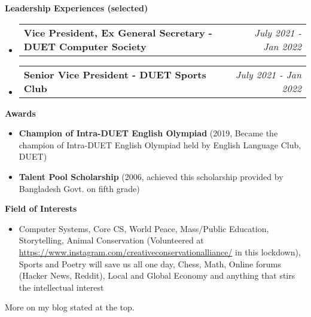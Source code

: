 \documentclass[letterpaper,10pt]{article}
\makeatletter
\newcommand{\resheading}[1]{{\large \colorbox{mygrey}{\begin{minipage}{\textwidth}{\textbf{#1 \vphantom{p\^{E}}}}\end{minipage}}}}
\newcommand{\ressubheading}[4]{
	\begin{tabular*}{7.1in}{l@{\extracolsep{\fill}}r}
		\textbf{#1} & \textit{#4} \\
	\end{tabular*}\vspace{-6pt}}
\makeatother
\begin{document}
	\vspace{0.2in}
	
	\resheading{Leadership Experiences (selected)}
	\begin{itemize}
		\item \ressubheading{Vice President, Ex General Secretary - DUET Computer Society}{}{}{July 2021 - Jan 2022}
		\item \ressubheading{Senior Vice President - DUET Sports Club}{}{}{July 2021 - Jan 2022}
		
	\end{itemize}

	\vspace{0.2in}
	
	\resheading{Awards}
	\begin{itemize}
				
		\item \textbf{Champion of Intra-DUET English Olympiad} (2019, Became the champion of Intra-DUET English Olympiad held by English Language Club, DUET)
	
		\item \textbf{Talent Pool Scholarship} (2006, achieved this scholarship provided by Bangladesh Govt. on fifth grade) 

	\end{itemize}

	\vspace{0.2in}
	
	\resheading{Field of Interests}
		\begin{itemize}
			\item Computer Systems, Core CS,  World Peace, Mass/Public Education, Storytelling, Animal Conservation (Volunteered at \url{https://www.instagram.com/creativeconservationalliance/} in this lockdown), Sports and Poetry will save us all one day, Chess, Math, Online forums (Hacker News, Reddit), Local and Global Economy and anything that stirs the intellectual interest
		\end{itemize}

	\vspace{0.2in}
	
    More on my blog stated at the top.
    
    \vfill
    
\end{document}
